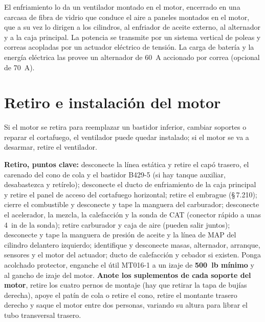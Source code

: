 El enfriamiento lo da un ventilador montado en el motor, encerrado en una carcasa de fibra de vidrio que conduce el aire a paneles montados en el motor, que a su vez lo dirigen a los cilindros, al enfriador de aceite externo, al alternador y a la caja principal. La potencia se transmite por un sistema vertical de poleas y correas acopladas por un actuador eléctrico de tensión. La carga de batería y la energía eléctrica las provee un alternador de 60~A accionado por correa (opcional de 70~A).

\section{Retiro e instalación del motor}

\begin{nota}
Si el motor se retira para reemplazar un bastidor inferior, cambiar soportes o reparar el cortafuego, el ventilador puede quedar instalado; si el motor se va a desarmar, retire el ventilador.
\end{nota}

\textbf{Retiro, puntos clave:} desconecte la línea estática y retire el capó trasero, el carenado del cono de cola y el bastidor B429-5 (si hay tanque auxiliar, desabastezca y retírelo); desconecte el ducto de enfriamiento de la caja principal y retire el panel de acceso del cortafuego horizontal; retire el embrague (\S\,7.210); cierre el combustible y desconecte y tape la manguera del carburador; desconecte el acelerador, la mezcla, la calefacción y la sonda de CAT (conector rápido a unas 4~in de la sonda); retire carburador y caja de aire (pueden salir juntos); desconecte y tape la manguera de presión de aceite y la línea de MAP del cilindro delantero izquierdo; identifique y desconecte masas, alternador, arranque, sensores y el motor del actuador; ducto de calefacción y cebador si existen. Ponga acolchado protector, enganche el útil MT016-1 a un izaje de \textbf{500~lb mínimo} y al gancho de izaje del motor. \textbf{Anote los suplementos de cada soporte del motor}, retire los cuatro pernos de montaje (hay que retirar la tapa de bujías derecha), apoye el patín de cola o retire el cono, retire el montante trasero derecho y saque el motor entre dos personas, variando su altura para librar el tubo transversal trasero.

